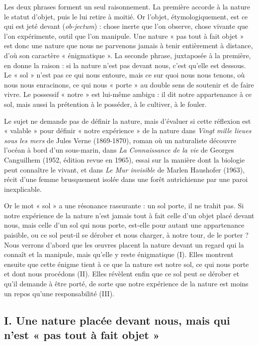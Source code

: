 \documentclass[11pt,a4paper]{article}
\begin{document}
Les deux phrases forment un seul raisonnement. La première accorde à la nature le statut d'objet, puis le lui retire à moitié. Or l'objet, étymologiquement, est ce qui est jeté devant (\emph{ob-jectum}) : chose inerte que l'on observe, chose vivante que l'on expérimente, outil que l'on manipule. Une nature « pas tout à fait objet » est donc une nature que nous ne parvenons jamais à tenir entièrement à distance, d'où son caractère « énigmatique ». La seconde phrase, juxtaposée à la première, en donne la raison : si la nature n'est pas devant nous, c'est qu'elle est dessous. Le « sol » n'est pas ce qui nous entoure, mais ce sur quoi nous nous tenons, où nous nous enracinons, ce qui nous « porte » au double sens de soutenir et de faire vivre. Le possessif « notre » est lui-même ambigu : il dit notre appartenance à ce sol, mais aussi la prétention à le posséder, à le cultiver, à le fouler.

Le sujet ne demande pas de définir la nature, mais d'évaluer si cette réflexion est « valable » pour définir « notre expérience » de la nature dans \emph{Vingt mille lieues sous les mers} de Jules Verne (1869-1870), roman où un naturaliste découvre l'océan à bord d'un sous-marin, dans \emph{La Connaissance de la vie} de Georges Canguilhem (1952, édition revue en 1965), essai sur la manière dont la biologie peut connaître le vivant, et dans \emph{Le Mur invisible} de Marlen Haushofer (1963), récit d'une femme brusquement isolée dans une forêt autrichienne par une paroi inexplicable.

Or le mot « sol » a une résonance rassurante : un sol porte, il ne trahit pas. Si notre expérience de la nature n'est jamais tout à fait celle d'un objet placé devant nous, mais celle d'un sol qui nous porte, est-elle pour autant une appartenance paisible, ou ce sol peut-il se dérober et nous charger, à notre tour, de le porter ? Nous verrons d'abord que les œuvres placent la nature devant un regard qui la connaît et la manipule, mais qu'elle y reste énigmatique (I). Elles montrent ensuite que cette énigme tient à ce que la nature est notre sol, ce qui nous porte et dont nous procédons (II). Elles révèlent enfin que ce sol peut se dérober et qu'il demande à être porté, de sorte que notre expérience de la nature est moins un repos qu'une responsabilité (III).

\hypertarget{i.-une-nature-placuxe9e-devant-nous-mais-qui-nest-pas-tout-uxe0-fait-objet}{%
\subsection{I. Une nature placée devant nous, mais qui n'est « pas tout à fait objet »}\label{i.-une-nature-placuxe9e-devant-nous-mais-qui-nest-pas-tout-uxe0-fait-objet}}
\end{document}
